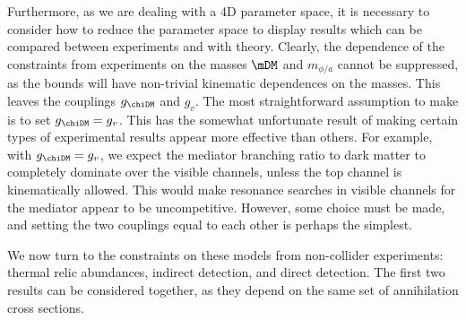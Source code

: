 Furthermore, as we are dealing with a 4D parameter space, it is necessary to consider how to reduce the parameter space to display results which can be compared between experiments and with theory. Clearly, the dependence of the constraints from experiments on the masses $\mDM$ and $m_{\phi/a}$ cannot be suppressed, as the bounds will have non-trivial kinematic dependences on the masses. This leaves the couplings $g_\chiDM$ and $g_v$. The most straightforward assumption to make is to set $g_\chiDM = g_v$. This has the somewhat unfortunate result of making certain types of experimental results appear more effective than others. For example, with $g_\chiDM = g_v$, we expect the mediator branching ratio to dark matter to completely dominate over the visible channels, unless the top channel is kinematically allowed. This would make resonance searches in visible channels for the mediator appear to be uncompetitive. However, some choice must be made, and setting the two couplings equal to each other is perhaps the simplest.

We now turn to the constraints on these models from non-collider experiments: thermal relic abundances, indirect detection, and direct detection. The first two results can be considered together, as they depend on the same set of annihilation cross sections.

